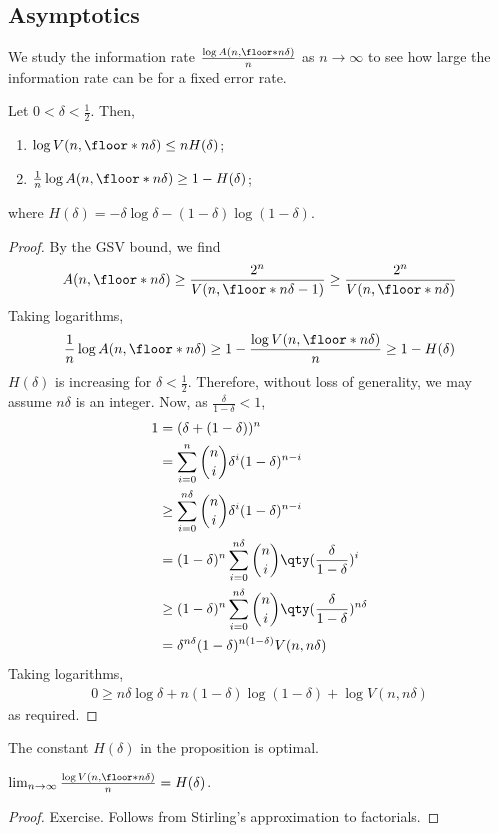 \subsection{Asymptotics}
We study the information rate $\frac{\log A(n,\floor*{n\delta})}{n}$ as $n \to \infty$ to see how large the information rate can be for a fixed error rate.
\begin{proposition}
    Let $0 < \delta < \frac{1}{2}$.
    Then,
    \begin{enumerate}
        \item $\log V(n,\floor*{n\delta}) \leq nH(\delta)$;
        \item $\frac{1}{n} \log A(n,\floor*{n\delta}) \geq 1 - H(\delta)$;
    \end{enumerate}
    where $H(\delta) = -\delta \log \delta - (1-\delta)\log (1-\delta)$.
\end{proposition}
\begin{proof}
    By the GSV bound, we find
    \begin{align*}
        A(n,\floor*{n\delta}) \geq \frac{2^n}{V(n,\floor*{n\delta} - 1)} \geq \frac{2^n}{V(n,\floor*{n\delta})}
    \end{align*}
    Taking logarithms,
    \begin{align*}
        \frac{1}{n}\log A(n,\floor*{n\delta}) \geq 1 - \frac{\log V(n,\floor*{n\delta})}{n} \geq 1 - H(\delta)
    \end{align*}
    $H(\delta)$ is increasing for $\delta < \frac{1}{2}$.
    Therefore, without loss of generality, we may assume $n\delta$ is an integer.
    Now, as $\frac{\delta}{1-\delta} < 1$,
    \begin{align*}
        1 &= (\delta + (1-\delta))^n \\
        &= \sum_{i=0}^n \binom{n}{i} \delta^i (1-\delta)^{n-i} \\
        &\geq \sum_{i=0}^{n\delta} \binom{n}{i} \delta^i (1-\delta)^{n-i} \\
        &= (1-\delta)^n \sum_{i=0}^{n\delta} \binom{n}{i} \qty(\frac{\delta}{1-\delta})^i \\
        &\geq (1-\delta)^n \sum_{i=0}^{n\delta} \binom{n}{i} \qty(\frac{\delta}{1-\delta})^{n\delta} \\
        &= \delta^{n\delta} (1-\delta)^{n(1-\delta)} V(n,n\delta)
    \end{align*}
    Taking logarithms,
    \begin{align*}
        0 \geq n\delta \log \delta + n(1-\delta) \log(1-\delta) + \log V(n,n\delta)
    \end{align*}
    as required.
\end{proof}
The constant $H(\delta)$ in the proposition is optimal.
\begin{lemma}
    $\lim_{n \to \infty} \frac{\log V(n,\floor*{n\delta})}{n} = H(\delta)$.
\end{lemma}
\begin{proof}
    Exercise.
    Follows from Stirling's approximation to factorials.
\end{proof}

